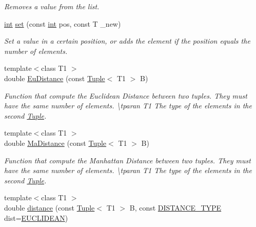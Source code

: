 \begin{DoxyCompactItemize}
\begin{DoxyCompactList}\small\item\em Removes a value from the list. \end{DoxyCompactList}\item 
\mbox{\hyperlink{draw_8hh_aa620a13339ac3a1177c86edc549fda9b}{int}} \mbox{\hyperlink{class_tuple_a6ecd34c0308891b7bec87b4736a6eaa5}{set}} (const \mbox{\hyperlink{draw_8hh_aa620a13339ac3a1177c86edc549fda9b}{int}} pos, const T \+\_\+new)
\begin{DoxyCompactList}\small\item\em Set a value in a certain position, or adds the element if the position equals the number of elements. \end{DoxyCompactList}\item 
{\footnotesize template$<$class T1 $>$ }\\double \mbox{\hyperlink{class_tuple_a973d6cae203bca0c1ce0d0b65279e433}{Eu\+Distance}} (const \mbox{\hyperlink{class_tuple}{Tuple}}$<$ T1 $>$ B)
\begin{DoxyCompactList}\small\item\em Function that compute the Euclidean Distance between two tuples. They must have the same number of elements. \textbackslash{}tparan T1 The type of the elements in the second \mbox{\hyperlink{class_tuple}{Tuple}}. \end{DoxyCompactList}\item 
{\footnotesize template$<$class T1 $>$ }\\double \mbox{\hyperlink{class_tuple_ac668269743d9be71769c9b4a424c785f}{Ma\+Distance}} (const \mbox{\hyperlink{class_tuple}{Tuple}}$<$ T1 $>$ B)
\begin{DoxyCompactList}\small\item\em Function that compute the Manhattan Distance between two tuples. They must have the same number of elements. \textbackslash{}tparan T1 The type of the elements in the second \mbox{\hyperlink{class_tuple}{Tuple}}. \end{DoxyCompactList}\item 
{\footnotesize template$<$class T1 $>$ }\\double \mbox{\hyperlink{class_tuple_af47521571361439c96392dee70a79cc7}{distance}} (const \mbox{\hyperlink{class_tuple}{Tuple}}$<$ T1 $>$ B, const \mbox{\hyperlink{maths_8hh_ac50d7263b1cae8691420b86282b27f90}{D\+I\+S\+T\+A\+N\+C\+E\+\_\+\+T\+Y\+PE}} dist=\mbox{\hyperlink{maths_8hh_ac50d7263b1cae8691420b86282b27f90a81bbbc4428c3ff3f1327e94957e2b5f1}{E\+U\+C\+L\+I\+D\+E\+AN}})

\end{DoxyCompactItemize}
